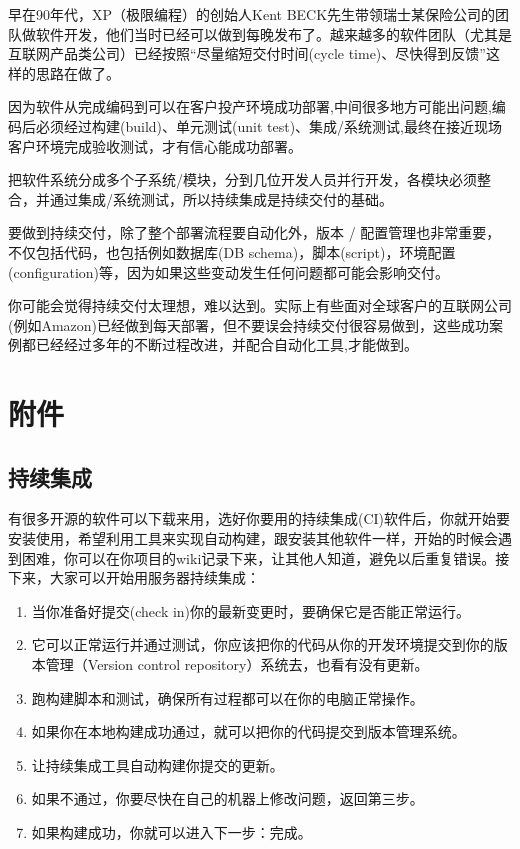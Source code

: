 早在90年代，XP（极限编程）的创始人Kent
BECK先生带领瑞士某保险公司的团队做软件开发，他们当时已经可以做到每晚发布了。越来越多的软件团队（尤其是互联网产品类公司）已经按照``尽量缩短交付时间(cycle
time)、尽快得到反馈''这样的思路在做了。

因为软件从完成编码到可以在客户投产环境成功部署,中间很多地方可能出问题,编码后必须经过构建(build)、单元测试(unit
test)、集成/系统测试,最终在接近现场客户环境完成验收测试，才有信心能成功部署。

把软件系统分成多个子系统/模块，分到几位开发人员并行开发，各模块必须整合，并通过集成/系统测试，所以持续集成是持续交付的基础。

要做到持续交付，除了整个部署流程要自动化外，版本 /
配置管理也非常重要，不仅包括代码，也包括例如数据库(DB
schema)，脚本(script)，环境配置(configuration)等，因为如果这些变动发生任何问题都可能会影响交付。

你可能会觉得持续交付太理想，难以达到。实际上有些面对全球客户的互联网公司(例如Amazon)已经做到每天部署，但不要误会持续交付很容易做到，这些成功案例都已经经过多年的不断过程改进，并配合自动化工具,才能做到。

\hypertarget{ux9644ux4ef6}{%
\section{附件}\label{ux9644ux4ef6}}

\hypertarget{ux6301ux7eedux96c6ux6210-1}{%
\subsection{持续集成}\label{ux6301ux7eedux96c6ux6210-1}}

有很多开源的软件可以下载来用，选好你要用的持续集成(CI)软件后，你就开始要安装使用，希望利用工具来实现自动构建，跟安装其他软件一样，开始的时候会遇到困难，你可以在你项目的wiki记录下来，让其他人知道，避免以后重复错误。接下来，大家可以开始用服务器持续集成：

\begin{enumerate}
\tightlist
\item
  当你准备好提交(check in)你的最新变更时，要确保它是否能正常运行。
\item
  它可以正常运行并通过测试，你应该把你的代码从你的开发环境提交到你的版本管理（Version
  control repository）系统去，也看有没有更新。
\item
  跑构建脚本和测试，确保所有过程都可以在你的电脑正常操作。
\item
  如果你在本地构建成功通过，就可以把你的代码提交到版本管理系统。
\item
  让持续集成工具自动构建你提交的更新。
\item
  如果不通过，你要尽快在自己的机器上修改问题，返回第三步。
\item
  如果构建成功，你就可以进入下一步：完成。
\end{enumerate}

